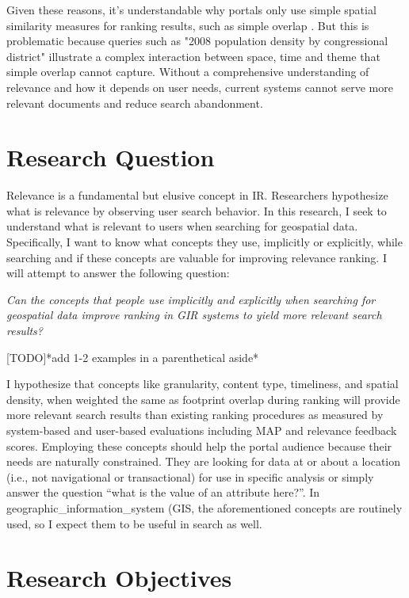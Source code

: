 Given these reasons, it’s understandable why portals only use simple spatial similarity measures for ranking results, such as simple overlap . But this is problematic because queries such as "2008 population density by congressional district" illustrate a complex interaction between space, time and theme that simple overlap cannot capture. Without a comprehensive understanding of relevance and how it depends on user needs, current systems cannot serve more relevant documents and reduce search abandonment.

\section{Research Question}

Relevance is a fundamental but elusive concept in IR. Researchers hypothesize what is relevance by observing user search behavior. In this research, I seek to understand what is relevant to users when searching for geospatial data. Specifically, I want to know what concepts they use, implicitly or explicitly, while searching and if these concepts are valuable for improving relevance ranking. I will attempt to answer the following question:
\linebreak

\emph{Can the concepts that people use implicitly and explicitly when searching for geospatial data improve ranking in GIR systems to yield more relevant search results?}
\linebreak

[TODO]*add 1-2 examples in a parenthetical aside*

I hypothesize that concepts like granularity, content type, timeliness, and spatial density, when weighted the same as footprint overlap during ranking will provide more relevant search results than existing ranking procedures as measured by system-based and user-based evaluations including MAP and relevance feedback scores. Employing these concepts should help the portal audience because their needs are naturally constrained. They are looking for data at or about a location (i.e., not navigational or transactional) for use in specific analysis or simply answer the question “what is the value of an attribute here?”.  In \gls{geographic_information_system} (\acrshort{GIS}, the aforementioned concepts are routinely used, so I expect them to be useful in search as well.

\section{Research Objectives}

